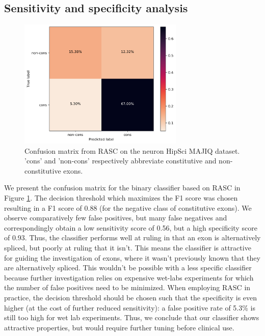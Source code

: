 \subsection{Sensitivity and specificity analysis}
\begin{figure}
	\centering\includegraphics[width=0.7\textwidth]{../visualizations/ch5-results/confusion_matrix.png} 
	\caption{Confusion matrix from RASC on the neuron HipSci MAJIQ dataset. 'cons' and 'non-cons' respectively abbreviate constitutive and non-constitutive exons. }
	\label{fig:confusion_matrix}
\end{figure}

We present the confusion matrix for the binary classifier based on RASC in Figure \ref{fig:confusion_matrix}. The decision threshold which maximizes the F1 score was chosen resulting in a F1 score of 0.88 (for the negative class of constitutive exons). We observe comparatively few false positives, but many false negatives and correspondingly obtain a low sensitivity score of 0.56, but a high specificity score of 0.93. Thus, the classifier performs well at ruling in that an exon is alternatively spliced, but poorly at ruling that it isn't. This means the classifier is attractive for guiding the investigation of exons, where it wasn't previously known that they are alternatively spliced. This wouldn't be possible with a less specific classifier because further investigation relies on expensive wet-labs experiments for which the number of false positives need to be minimized. When employing RASC in practice, the decision threshold should be chosen such that the specificity is even higher (at the cost of further reduced sensitivity): a false positive rate of 5.3\% is still too high for wet lab experiments. Thus, we conclude that our classifier shows attractive properties, but would require further tuning before clinical use. 


